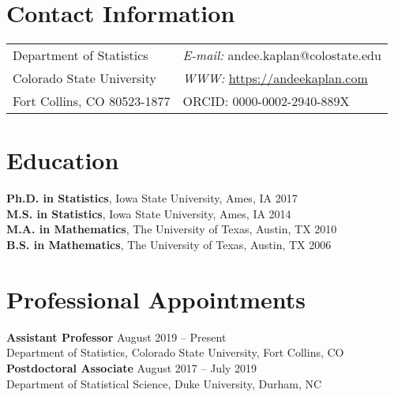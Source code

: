 \documentclass[margin,line]{res}
\begin{document}
\nocite{*}

\begin{resume}

\section{\sc Contact Information}
\vspace{.05in}
\begin{tabular}{@{}p{2in}p{4in}}
Department of Statistics  & {\it E-mail:} andee.kaplan@colostate.edu\\
Colorado State University &  {\it WWW:} \url{https://andeekaplan.com} \\
Fort Collins, CO 80523-1877 & ORCID: 0000-0002-2940-889X\\
\end{tabular}

\section{\sc Education}
{\bf Ph.D. in Statistics}, Iowa State University, Ames, IA \hfill 2017 \\
{\bf M.S. in Statistics}, Iowa State University, Ames, IA \hfill 2014 \\
{\bf M.A. in Mathematics}, The University of Texas, Austin, TX \hfill 2010 \\
{\bf B.S. in Mathematics}, The University of Texas, Austin, TX \hfill 2006 


\section{\sc Professional Appointments}
{\bf Assistant Professor} \hfill August 2019 -- Present \\
Department of Statistics, Colorado State University,  Fort Collins, CO\\
{\bf Postdoctoral Associate}  \hfill August 2017 -- July 2019 \\
Department of Statistical Science, Duke University, Durham, NC 




\end{resume}
\end{document}
